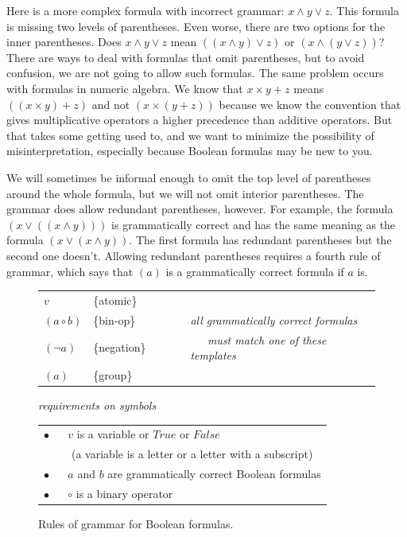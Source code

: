 Here is a more complex formula with incorrect grammar:
$x \wedge y \vee z$. This formula is missing two levels of parentheses.
Even worse, there are two options for the inner parentheses.
Does $x \wedge y \vee z$ mean $((x \wedge y) \vee z)$ or $(x \wedge (y \vee z))$?
There are ways to deal with formulas that omit parentheses,
but to avoid confusion, we are not going to allow such formulas.
The same problem occurs with formulas in numeric algebra.
We know that $x \times y + z$ means $((x \times y) + z)$ and
not $(x \times (y + z))$ because we know the convention that
gives multiplicative operators a higher precedence than additive operators.
But that takes some getting used to, and we want to
minimize the possibility of misinterpretation,
especially because Boolean formulas may be new to you.

We will sometimes be informal enough to omit the
top level of parentheses around the whole formula,
but we will not omit interior parentheses.
The grammar does allow redundant parentheses, however.
For example, the formula $(x \vee ((x \wedge y)))$
is grammatically correct and has the same meaning as the formula
$(x \vee (x \wedge y))$.
The first formula has redundant parentheses
but the second one doesn't.
Allowing redundant parentheses requires a fourth rule of grammar,
which says that $(a)$ is a grammatically correct formula
if $a$ is.

\begin{figure}
\begin{center}
\begin{spacing}{0.9}
\begin{tabular}{llll}
$v$             & \{atomic\}    &~~~~& \\
$(a \circ b)$   & \{bin-op\}    &~~~~& \emph{all grammatically correct formulas} \\
$(\neg a)$      & \{negation\}  &~~~~& \emph{~~~must match one of these templates}  \\
$(a)$           & \{group\}     &~~~~& \\
\end{tabular}

\vspace{2 mm}

\emph{requirements on symbols}

\begin{tabular}{l}
\hline
$\bullet$ ~~ $v$ is a variable or $True$ or $False$ \\
~~~~~(a variable is a letter or a letter with a subscript) \\
$\bullet$ ~~ $a$ and $b$ are grammatically correct Boolean formulas \\
$\bullet$ ~~ $\circ$ is a binary operator \\
\hline
\end{tabular}
\end{spacing}
\end{center}
\caption{Rules of grammar for Boolean formulas.}
\label{fig-02-grammar}
\end{figure}

